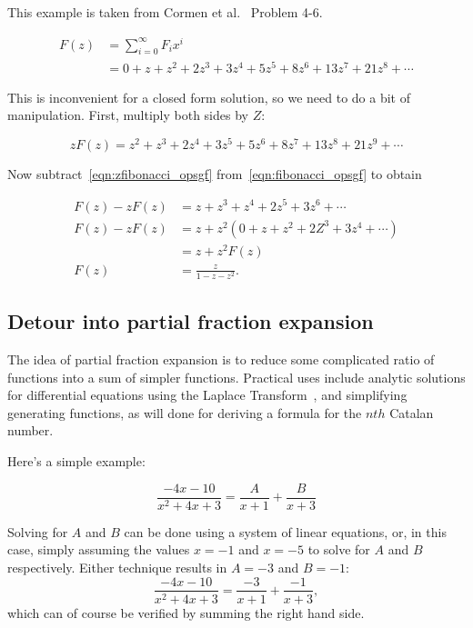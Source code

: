 \documentclass{article}
\begin{document}
This example is taken from Cormen et al.~\cite[p. 74]{cormen:th:1990}
Problem 4-6.

\begin{align}
F(z) & = \sum_{i=0}^{\infty} F_ix^i\\
\label{eqn:fibonacci_opsgf}
     & = 0 + z + z^2 + 2z^3 + 3z^4 + 5z^5 + 8z^6 + 13z^7 + 21z^8+\cdots
\end{align}

This is inconvenient for a closed form solution, so we need to do a bit of
manipulation. First, multiply both sides by $Z$:

\begin{equation}
\label{eqn:zfibonacci_opsgf}
zF(z) = z^2 + z^3 + 2z^4 + 3z^5 + 5z^6 + 8z^7 + 13z^8 + 21z^9+\cdots
\end{equation}

Now subtract~\ref{eqn:zfibonacci_opsgf} from~\ref{eqn:fibonacci_opsgf} to
obtain

\begin{align}
F(z) - zF(z) & = z + z^3 + z^4 + 2z^5 + 3z^6 +\cdots\\
F(z) - zF(z) & = z + z^2(0 + z + z^2 + 2Z^3 + 3z^4 +\cdots)\\
             & = z + z^2F(z)\\
        F(z) & = \frac{z}{1-z-z^2}.
\end{align}


\subsection{Detour into partial fraction expansion}

The idea of partial fraction expansion is to reduce some
complicated ratio of functions into a sum of simpler functions.
Practical uses include analytic solutions for differential equations
using the Laplace Transform~\cite[p. 347]{nagle:rk1989}, and simplifying
generating functions, as will done for deriving a formula for the
$nth$ Catalan number.

Here's a simple example:

\begin{equation}
\frac{-4x-10}{x^2+4x+3} = \frac{A}{x+1} + \frac{B}{x+3}
\end{equation}

Solving for $A$ and $B$ can be done using a system of linear equations,
or, in this case, simply assuming the values $x = -1$ and $x = -5$
to solve for $A$ and $B$ respectively. Either technique results in $A = -3$ and
$B = -1$:
\begin{equation}
\frac{-4x-10}{x^2+4x+3} = \frac{-3}{x+1} + \frac{-1}{x+3},
\end{equation}
which can of course be verified by summing the right hand side.
\end{document}
